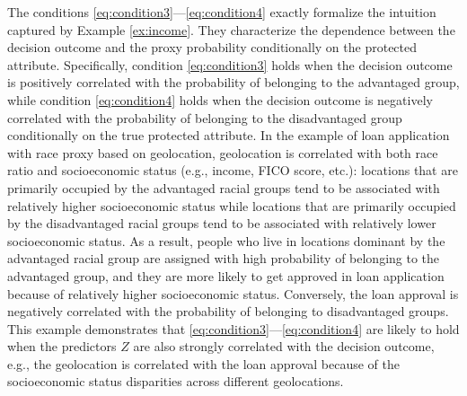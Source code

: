 The conditions \eqref{eq:condition3}---\eqref{eq:condition4} exactly formalize the intuition captured by Example \ref{ex:income}.
They characterize the dependence between the decision outcome and the proxy probability conditionally on the protected attribute.
Specifically, condition \eqref{eq:condition3} holds when the decision outcome is positively correlated with the probability of belonging to the advantaged group, while condition \eqref{eq:condition4} holds when the decision outcome is negatively correlated with the probability of belonging to the disadvantaged group conditionally on the true protected attribute.
In the example of loan application with race proxy based on geolocation, geolocation is correlated with both race ratio and socioeconomic status (e.g., income, FICO score, etc.): locations that are primarily occupied by the advantaged racial groups tend to be associated with relatively higher socioeconomic status while locations that are primarily occupied by the disadvantaged racial groups tend to be associated with relatively lower socioeconomic status.
As a result, people who live in locations dominant by the advantaged racial group are assigned with high probability of belonging to the advantaged group, and they are more likely to get approved in loan application because of relatively higher socioeconomic status.
Conversely, the loan approval is negatively correlated with the probability of belonging to disadvantaged groups.
This example demonstrates that \eqref{eq:condition3}---\eqref{eq:condition4} are likely to hold when the predictors $Z$ are also strongly correlated with the decision outcome, e.g., the geolocation is correlated with the loan approval because of the socioeconomic status disparities across different geolocations.

